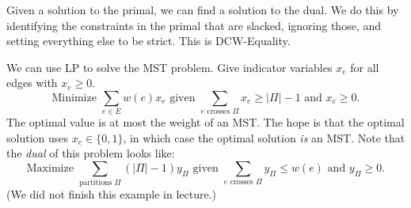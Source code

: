 \begin{remark}
    Given a solution to the primal, we can find a solution to the dual.  We do this by identifying the constraints in the primal that are slacked, ignoring those, and setting everything else to be strict.  This is DCW-Equality.
\end{remark}

We can use LP to solve the MST problem.  Give indicator variables $x_e$ for all edges with $x_e \geq 0$.
\[ \text{Minimize } \sum_{e \in E} w(e) x_e \text{ given } \sum_{e \text{ crosses } \Pi} x_e \geq |\Pi| - 1 \text{ and } x_e \geq 0. \]
The optimal value is at most the weight of an MST.  The hope is that the optimal solution uses $x_e \in \{0, 1\}$, in which case the optimal solution \emph{is} an MST.  Note that the \emph{dual} of this problem looks like:
\[ \text{Maximize } \sum_{\text{partitions } \Pi} (|\Pi| - 1)y_{\Pi} \text{ given } \sum_{e \text{ crosses } \Pi} y_{\Pi} \leq w(e) \text{ and } y_{\Pi} \geq 0. \]
(We did not finish this example in lecture.)


